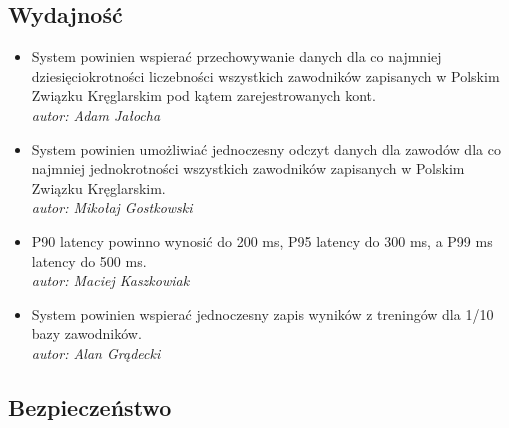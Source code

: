 \documentclass[polish, a4paper]{article}
\begin{document}
\subsection{Wydajność}

\begin{itemize}

\item System powinien wspierać przechowywanie danych dla co najmniej dziesięciokrotności liczebności wszystkich zawodników zapisanych w Polskim Związku Kręglarskim pod kątem zarejestrowanych kont.\\ \emph{autor: Adam Jałocha}

\item System powinien umożliwiać jednoczesny odczyt danych dla zawodów dla co najmniej jednokrotności wszystkich zawodników zapisanych w Polskim Związku Kręglarskim.\\ \emph{autor: Mikołaj Gostkowski}

\item P90 latency powinno wynosić do 200 ms, P95 latency do 300 ms, a P99 ms latency do 500 ms. \\ \emph{autor: Maciej Kaszkowiak}

\item System powinien wspierać jednoczesny zapis wyników z treningów dla 1/10 bazy zawodników. \\ \emph{autor: Alan Grądecki}

\end{itemize}



\subsection{Bezpieczeństwo}
\end{document}
